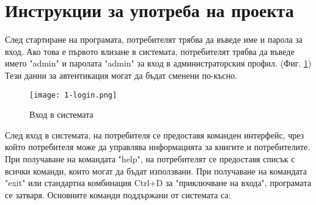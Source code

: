 \section{Инструкции за употреба на проекта}
След стартиране на програмата, потребителят трябва да въведе име и парола за вход. Ако това е първото влизане в системата, потребителят трябва да въведе името "admin" и паролата "admin" за вход в администраторския профил. (Фиг. \ref{fig:login}) Тези данни за автентикация могат да бъдат сменени по-късно.

\begin{figure}[H]
    \texttt{[image: 1-login.png]}
    \centering
    \caption{Вход в системата}
    \label{fig:login}
\end{figure}

След вход в системата, на потребителя се предоставя команден интерфейс, чрез който потребителя може да управлява информацията за книгите и потребителите. При получаване на командата "help", на потребителят се предоставя списък с всички команди, които могат да бъдат използвани. При получаване на командата "exit" или стандартна комбинация Ctrl+D за "приключване на входа", програмата се затваря. Основните команди поддържани от системата са:
